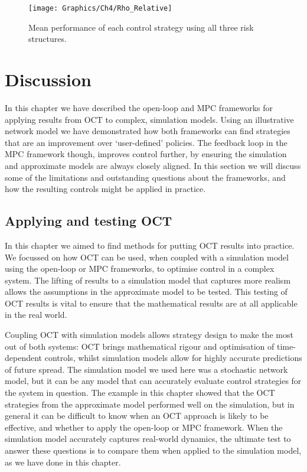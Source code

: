 \begin{figure}
    \begin{center}
        \texttt{[image: Graphics/Ch4/Rho\_Relative]}
        \caption[Comparing control performance across risk structures]{Mean performance of each control strategy using all three risk structures.}
        \label{fig:ch4:rho_relative}
    \end{center}
\end{figure}

\FloatBarrier

\section{Discussion}\label{sec:ch4:Discussion}

In this chapter we have described the open-loop and MPC frameworks for applying results from OCT to complex, simulation models. Using an illustrative network model we have demonstrated how both frameworks can find strategies that are an improvement over `user-defined' policies. The feedback loop in the MPC framework though, improves control further, by ensuring the simulation and approximate models are always closely aligned. In this section we will discuss some of the limitations and outstanding questions about the frameworks, and how the resulting controls might be applied in practice.

\subsection{Applying and testing OCT}

In this chapter we aimed to find methods for putting OCT results into practice. We focussed on how OCT can be used, when coupled with a simulation model using the open-loop or MPC frameworks, to optimise control in a complex system. The lifting of results to a simulation model that captures more realism allows the assumptions in the approximate model to be tested. This testing of OCT results is vital to ensure that the mathematical results are at all applicable in the real world.

Coupling OCT with simulation models allows strategy design to make the most out of both systems: OCT brings mathematical rigour and optimisation of time-dependent controls, whilst simulation models allow for highly accurate predictions of future spread. The simulation model we used here was a stochastic network model, but it can be any model that can accurately evaluate control strategies for the system in question. The example in this chapter showed that the OCT strategies from the approximate model performed well on the simulation, but in general it can be difficult to know when an OCT approach is likely to be effective, and whether to apply the open-loop or MPC framework. When the simulation model accurately captures real-world dynamics, the ultimate test to answer these questions is to compare them when applied to the simulation model, as we have done in this chapter.

